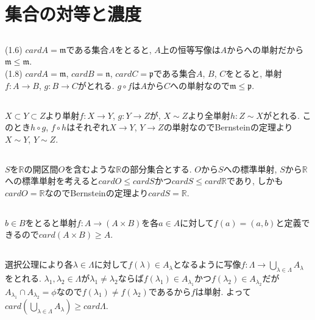 \documentclass{jsarticle}
\begin{document}
\section{集合の対等と濃度} %
\subsection{} %
\noindent
(1.6) $card A = \mathfrak{m}$である集合$A$をとると, $A$上の恒等写像は$A$からへの単射だから$\mathfrak{m} \leq \mathfrak{m}$.\\
(1.8) $card A = \mathfrak{m}$, $card B = \mathfrak{n}$, $card C = \mathfrak{p}$である集合$A$, $B$, $C$をとると, 単射$f:A \rightarrow B$, $g:B \rightarrow C$がとれる. $g \circ f$は$A$から$C$への単射なので$\mathfrak{m} \leq \mathfrak{p}$.

\subsection{} %
$X \subset Y \subset Z$より単射$f: X \rightarrow Y$, $g: Y \rightarrow Z$が, $X \sim Z$より全単射$h: Z \sim X$がとれる. このとき$h \circ g$, $f \circ h$はそれぞれ$X \rightarrow Y$, $Y \rightarrow Z$の単射なのでBernsteinの定理より$X \sim Y$, $Y \sim Z$.

\subsection{} %
$S$を$\mathbb{R}$の開区間$O$を含むような$\mathbb{R}$の部分集合とする. $O$から$S$への標準単射, $S$から$\mathbb{R}$への標準単射を考えると$card O \leq card S$かつ$card S \leq card \mathbb{R}$であり, しかも$card O = \mathbb{R}$なのでBernsteinの定理より$card S = \mathbb{R}$.

\subsection{} %
$b \in B$をとると単射$f: A \rightarrow (A \times B)$を各$a \in A$に対して$f(a) = (a, b)$と定義できるので$card (A \times B) \geq A$.

\subsection{} %
選択公理により各$\lambda \in \Lambda$に対して$f(\lambda) \in A_\lambda$となるように写像$f: \Lambda \rightarrow \bigcup_{\lambda \in \Lambda}A_\lambda$をとれる. $\lambda_1, \lambda_2 \in \Lambda$が$\lambda_1 \neq \lambda_2$ならば$f(\lambda_1) \in A_{\lambda_1}$かつ$f(\lambda_2) \in A_{\lambda_2}$だが$A_{\lambda_1} \cap A_{\lambda_2} = \phi$なので$f(\lambda_1) \neq f(\lambda_2)$であるから$f$は単射. よって$card \left(\bigcup_{\lambda \in \Lambda}A_\lambda\right) \geq card \Lambda$.
\end{document}
